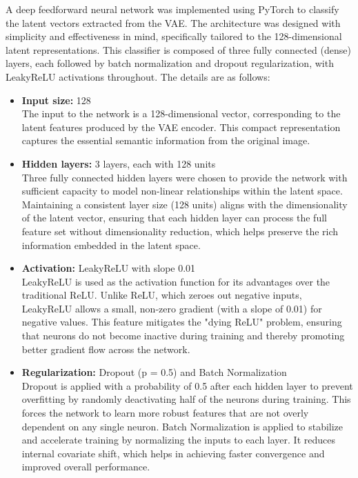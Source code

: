 A deep feedforward neural network was implemented using PyTorch to classify the latent vectors extracted from the VAE. The architecture was designed with simplicity and effectiveness in mind, specifically tailored to the 128-dimensional latent representations. This classifier is composed of three fully connected (dense) layers, each followed by batch normalization and dropout regularization, with LeakyReLU activations throughout. The details are as follows:

\begin{itemize}
    \item \textbf{Input size:} 128 \\
    The input to the network is a 128-dimensional vector, corresponding to the latent features produced by the VAE encoder. This compact representation captures the essential semantic information from the original image.
    
    \item \textbf{Hidden layers:} 3 layers, each with 128 units \\
    Three fully connected hidden layers were chosen to provide the network with sufficient capacity to model non-linear relationships within the latent space. Maintaining a consistent layer size (128 units) aligns with the dimensionality of the latent vector, ensuring that each hidden layer can process the full feature set without dimensionality reduction, which helps preserve the rich information embedded in the latent space.
    
    \item \textbf{Activation:} LeakyReLU with slope 0.01 \\
    LeakyReLU is used as the activation function for its advantages over the traditional ReLU. Unlike ReLU, which zeroes out negative inputs, LeakyReLU allows a small, non-zero gradient (with a slope of 0.01) for negative values. This feature mitigates the "dying ReLU" problem, ensuring that neurons do not become inactive during training and thereby promoting better gradient flow across the network.
    
    \item \textbf{Regularization:} Dropout (p = 0.5) and Batch Normalization \\
    Dropout is applied with a probability of 0.5 after each hidden layer to prevent overfitting by randomly deactivating half of the neurons during training. This forces the network to learn more robust features that are not overly dependent on any single neuron. Batch Normalization is applied to stabilize and accelerate training by normalizing the inputs to each layer. It reduces internal covariate shift, which helps in achieving faster convergence and improved overall performance.
    

\end{itemize}

